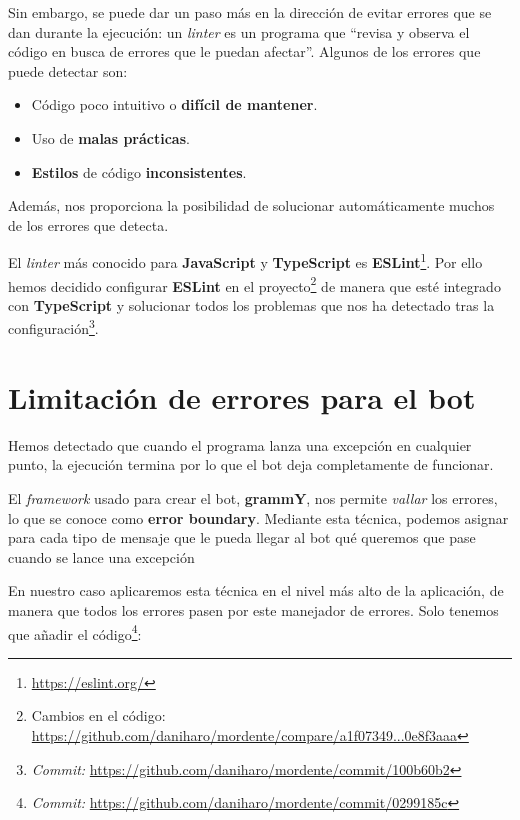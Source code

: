 Sin embargo, se puede dar un paso más en la dirección de evitar errores que se dan durante la ejecución: un \textit{linter} es un programa que ``revisa y observa el código en busca de errores que le puedan afectar''\cite{whatIsLinter}. Algunos de los errores que puede detectar son\cite{whatIsLinter}:

\begin{itemize}
    \item Código poco intuitivo o \textbf{difícil de mantener}.
    \item Uso de \textbf{malas prácticas}.
    \item \textbf{Estilos} de código \textbf{inconsistentes}.
\end{itemize}

Además, nos proporciona la posibilidad de solucionar automáticamente muchos de los errores que detecta.

El \textit{linter} más conocido para \textbf{JavaScript} y \textbf{TypeScript} es \textbf{ESLint}\footnote{\url{https://eslint.org/}}. Por ello hemos decidido configurar \textbf{ESLint} en el proyecto\footnote{Cambios en el código: \url{https://github.com/daniharo/mordente/compare/a1f07349...0e8f3aaa}} de manera que esté integrado con \textbf{TypeScript} y solucionar todos los problemas que nos ha detectado tras la configuración\footnote{\textit{Commit:} \url{https://github.com/daniharo/mordente/commit/100b60b2}}.

\section{Limitación de errores para el bot}\label{section:errorBoundary}

Hemos detectado que cuando el programa lanza una excepción en cualquier punto, la ejecución termina por lo que el bot deja completamente de funcionar.

El \textit{framework} usado para crear el bot, \textbf{grammY}, nos permite \textit{vallar} los errores, lo que se conoce como \textbf{error boundary}. Mediante esta técnica, podemos asignar para cada tipo de mensaje que le pueda llegar al bot qué queremos que pase cuando se lance una excepción

En nuestro caso aplicaremos esta técnica en el nivel más alto de la aplicación, de manera que todos los errores pasen por este manejador de errores. Solo tenemos que añadir el código\footnote{\textit{Commit:} \url{https://github.com/daniharo/mordente/commit/0299185c}}:

